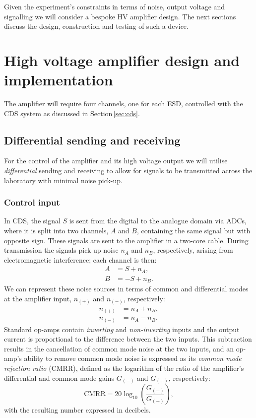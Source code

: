 Given the experiment's constraints in terms of noise, output voltage and signalling we will consider a bespoke \gls{HV} amplifier design. The next sections discuss the design, construction and testing of such a device.

\section{\label{sec:hv-amplifier}High voltage amplifier design and implementation}
The amplifier will require four channels, one for each \gls{ESD}, controlled with the \gls{CDS} system as discussed in Section\,\ref{sec:cds}.

\subsection{Differential sending and receiving}
For the control of the amplifier and its high voltage output we will utilise \emph{differential} sending and receiving to allow for signals to be transmitted across the laboratory with minimal noise pick-up.

\subsubsection{Control input}
In \gls{CDS}, the signal $S$ is sent from the digital to the analogue domain via \glspl{ADC}, where it is split into two channels, $A$ and $B$, containing the same signal but with opposite sign. These signals are sent to the amplifier in a two-core cable. During transmission the signals pick up noise $n_{A}$ and $n_{B}$, respectively, arising from electromagnetic interference; each channel is then:
\begin{align}
  A &= S + n_{A}, \\
  B &= -S + n_{B}.
\end{align}
We can represent these noise sources in terms of common and differential modes at the amplifier input, $n_{\left(+\right)}$ and $n_{\left(-\right)}$, respectively:
\begin{align}
  n_{\left(+\right)} &= n_{A} + n_{B}, \\
  n_{\left(-\right)} &= n_{A} - n_{B}.
\end{align}
Standard op-amps contain \emph{inverting} and \emph{non-inverting} inputs and the output current is proportional to the difference between the two inputs. This subtraction results in the cancellation of common mode noise at the two inputs, and an op-amp's ability to remove common mode noise is expressed as its \emph{common mode rejection ratio} (\gls{CMRR}), defined as the logarithm of the ratio of the amplifier's differential and common mode gains $G_{\left( - \right)}$ and $G_{\left( + \right)}$, respectively:
\begin{equation}
  \text{CMRR} = 20 \log_{10} \left( \frac{G_{\left(-\right)}}{G_{\left(+\right)}} \right),
\end{equation}
with the resulting number expressed in decibels.

